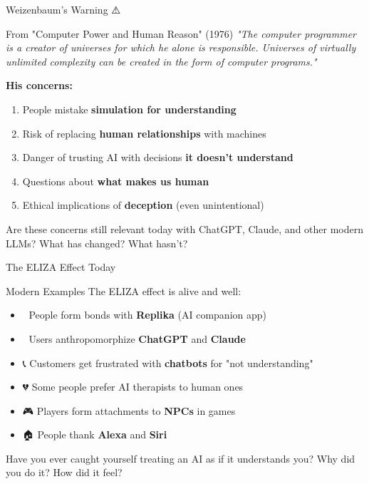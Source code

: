 \documentclass[aspectratio=169]{beamer}
\begin{document}
\begin{frame}{Weizenbaum's Warning ⚠️}
\small
\begin{block}{From "Computer Power and Human Reason" (1976)}
\textit{"The computer programmer is a creator of universes for which he alone is responsible. Universes of virtually unlimited complexity can be created in the form of computer programs."}
\end{block}

\vspace{0.3cm}

\textbf{His concerns:}
\begin{enumerate}\setlength{\itemsep}{0pt}
    \item People mistake \textbf{simulation for understanding}
    \item Risk of replacing \textbf{human relationships} with machines
    \item Danger of trusting AI with decisions \textbf{it doesn't understand}
    \item Questions about \textbf{what makes us human}
    \item Ethical implications of \textbf{deception} (even unintentional)
\end{enumerate}

\vspace{0.3cm}

\begin{discussion}
Are these concerns still relevant today with ChatGPT, Claude, and other modern LLMs? What has changed? What hasn't?
\end{discussion}
\end{frame}

\begin{frame}[shrink=10]{The ELIZA Effect Today 📱}
\small
\begin{block}{Modern Examples}
The ELIZA effect is alive and well:
\end{block}

\vspace{0.3cm}

\begin{itemize}\setlength{\itemsep}{0pt}
    \item 💬 People form bonds with \textbf{Replika} (AI companion app)
    \item 🤖 Users anthropomorphize \textbf{ChatGPT} and \textbf{Claude}
    \item 📞 Customers get frustrated with \textbf{chatbots} for "not understanding"
    \item 💔 Some people prefer AI therapists to human ones
    \item 🎮 Players form attachments to \textbf{NPCs} in games
    \item 🏠 People thank \textbf{Alexa} and \textbf{Siri}
\end{itemize}

\vspace{0.3cm}

\begin{thinkaboutit}
Have you ever caught yourself treating an AI as if it understands you? Why did you do it? How did it feel?
\end{thinkaboutit}
\end{frame}
\end{document}
